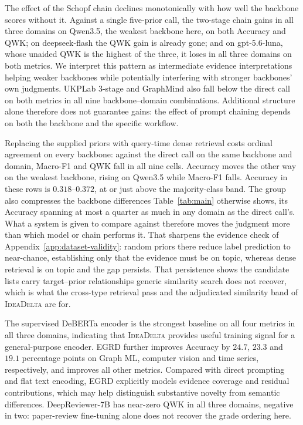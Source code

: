 The effect of the Schopf chain declines monotonically with how well the backbone
scores without it. Against a single five-prior call, the two-stage chain gains
in all three domains on Qwen3.5, the weakest backbone here, on both Accuracy and
QWK; on deepseek-flash the QWK gain is already gone; and on gpt-5.6-luna, whose
unaided QWK is the highest of the three, it loses in all three domains on both
metrics. We interpret this pattern as intermediate evidence interpretations
helping weaker backbones while potentially interfering with stronger backbones'
own judgments.
UKPLab 3-stage and GraphMind also fall below the direct call on both metrics
in all nine backbone--domain combinations. Additional structure alone therefore
does not guarantee gains: the effect of prompt chaining depends on both the
backbone and the specific workflow.

Replacing the supplied priors with query-time dense retrieval costs ordinal
agreement on every backbone: against the direct call on the same backbone and
domain, Macro-F1 and QWK fall in all nine cells. Accuracy moves the other way on
the weakest backbone, rising on Qwen3.5 while Macro-F1 falls. Accuracy in
these rows is $0.318$--$0.372$, at or just above the majority-class band. The group
also compresses the backbone differences Table~\ref{tab:main} otherwise shows,
its Accuracy spanning at most a quarter as much in any domain as the direct
call's. What a system is given to compare against therefore moves the judgment
more than which model or chain performs it. That sharpens the evidence check of
Appendix~\ref{app:dataset-validity}: random priors there reduce label prediction
to near-chance, establishing only that the evidence must be on topic, whereas
dense retrieval is on topic and the gap persists. That persistence shows the
candidate lists carry target--prior relationships generic similarity search does
not recover, which is what the cross-type retrieval pass and the adjudicated
similarity band of \textsc{IdeaDelta} are for.

The supervised DeBERTa encoder is the strongest baseline on all four metrics in all
three domains, indicating that \textsc{IdeaDelta} provides useful training
signal for a general-purpose encoder. EGRD further improves Accuracy by
$24.7$, $23.3$ and $19.1$ percentage points on Graph ML, computer vision and
time series, respectively, and improves all other metrics. Compared with direct
prompting and flat text encoding, EGRD explicitly models evidence coverage and
residual contributions, which may help distinguish substantive novelty from
semantic differences.
DeepReviewer-7B has near-zero QWK in all three domains, negative in two:
paper-review fine-tuning alone does not recover the grade ordering here.

